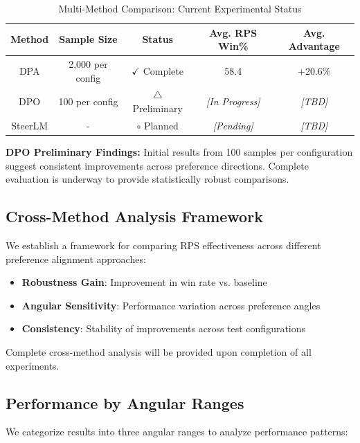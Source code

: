 \documentclass{article} %
\begin{document}
\begin{table}[t]
\centering
\caption{Multi-Method Comparison: Current Experimental Status}
\label{tab:preliminary_comparison}
\begin{tabular}{c|c|c|c|c}
\toprule
\textbf{Method} & \textbf{Sample Size} & \textbf{Status} & \textbf{Avg. RPS Win\%} & \textbf{Avg. Advantage} \\
\midrule
DPA & 2,000 per config & $\checkmark$ Complete & 58.4 & +20.6\% \\
DPO & 100 per config & $\triangle$ Preliminary & \textit{[In Progress]} & \textit{[TBD]} \\
SteerLM & - & $\circ$ Planned & \textit{[Pending]} & \textit{[TBD]} \\
\bottomrule
\end{tabular}
\end{table}

\textbf{DPO Preliminary Findings:} Initial results from 100 samples per configuration suggest consistent improvements across preference directions. Complete evaluation is underway to provide statistically robust comparisons.

\subsection{Cross-Method Analysis Framework}

We establish a framework for comparing RPS effectiveness across different preference alignment approaches:

\begin{itemize}
    \item \textbf{Robustness Gain}: Improvement in win rate vs. baseline
    \item \textbf{Angular Sensitivity}: Performance variation across preference angles  
    \item \textbf{Consistency}: Stability of improvements across test configurations
\end{itemize}

Complete cross-method analysis will be provided upon completion of all experiments.

\subsection{Performance by Angular Ranges}

We categorize results into three angular ranges to analyze performance patterns:
\end{document}
